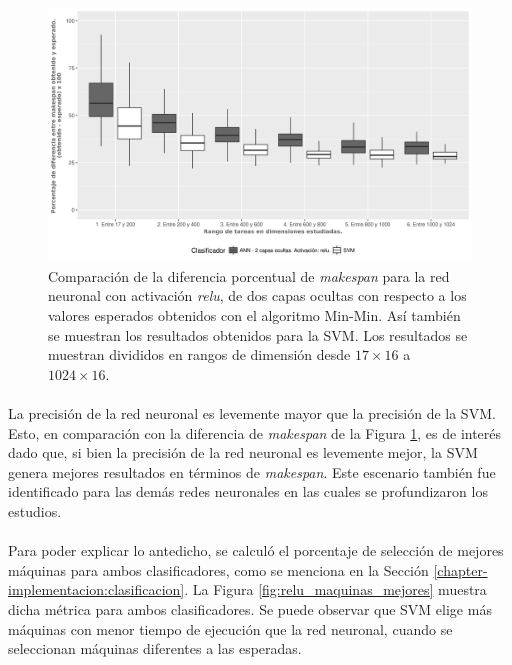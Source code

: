\begin{figure}[H]
  \centering
  \includegraphics[width=\columnwidth]{imagenes/relu/2_medianas_diferenciasann_2_capas_ocultas_relu.png}
  \caption{Comparación de la diferencia porcentual de \textit{makespan} para la red neuronal con activación \textit{relu}, de dos capas ocultas con respecto a los valores esperados obtenidos con el algoritmo Min-Min.
Así también se muestran los resultados obtenidos para la SVM.
Los resultados se muestran divididos en rangos de dimensión desde $ 17 \times 16$ a $ 1024 \times 16$.}
  \label{fig:relu_makespan}
\end{figure}

\newpage %

\paragraph{}La precisión de la red neuronal es levemente mayor que la precisión de la SVM.
Esto, en comparación con la diferencia de \textit{makespan} de la Figura \ref{fig:relu_makespan}, es de interés dado que, si bien la precisión de la red neuronal es levemente mejor, la SVM genera mejores resultados en términos de \textit{makespan}.
Este escenario también fue identificado para las demás redes neuronales en las cuales se profundizaron los estudios. 

\paragraph{} Para poder explicar lo antedicho, se calculó el porcentaje de selección de mejores máquinas para ambos clasificadores, como se menciona en la Sección \ref{chapter-implementacion:clasificacion}.
La Figura \ref{fig:relu_maquinas_mejores} muestra dicha métrica para ambos clasificadores.
Se puede observar que SVM elige más máquinas con menor tiempo de ejecución que la red neuronal, cuando  se seleccionan máquinas diferentes a las esperadas. 

